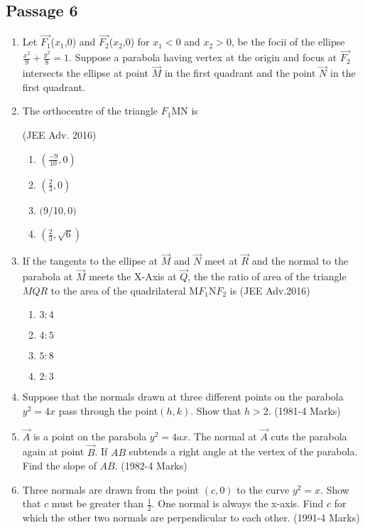 \subsection*{Passage 6}
\begin{enumerate}
\item[] Let $\vec{F_1}$($x_1$,0) and  $\vec{F_2}$($x_2$,0) for $x_1<0$ and $x_2>0$, be the focii of the ellipse $\frac{x^2}{9}+\frac{y^2}{8} =1$. Suppose a parabola having vertex at the origin and focus at $\vec{F_2}$ intersects the ellipse at point $\Vec{M}$ in the first quadrant and the point $\Vec{N}$ in the first quadrant.
\item The orthocentre of the triangle $F_1$MN is

         \hfill(JEE Adv. 2016)
\begin{enumerate}
     \item $(\frac{-9}{10},0)$   
     \item $(\frac{2}{3},0)$     
     \item $($9/10$,0)$ 
    \item $(\frac{2}{3},\sqrt{6})$ 
    \end{enumerate}
\item If the tangents to the ellipse at $\Vec{M}$ and $\Vec{N}$ meet at $\Vec{R}$ and the normal to the parabola at $\Vec{M}$ meets the X-Axis at $\Vec{Q}$, the the ratio of area of the triangle $MQR$ to the area of the quadrilateral M$F_1$N$F_2$ is
\hfill(JEE Adv.2016)
\begin{enumerate}
    \item $3:4$
    \item $4:5$
    \item $5:8$
    \item $2:3$
\end{enumerate}
    \item Suppose that the normals drawn at three different points on the parabola $y^2=4x$ pass through the point$(h,k)$. Show that $h>2$. 
		\hfill(1981-4 Marks)
		
	\item $\vec{A}$ is a point on the parabola $y^2=4ax$. The normal at $\vec{A}$ cuts the parabola again at point $\vec{B}$. If $AB$ subtends a right angle at the vertex of the parabola. Find the slope of $AB$.  
		\hfill(1982-4 Marks)
		
	\item Three normals are drawn from the point $(c,0)$ to the curve $y^2=x$. Show that $c$ must be greater than $\frac{1}{2}$. One normal is always the x-axis. Find $c$ for which the other two normals are perpendicular to each other. 
	      \hfill(1991-4 Marks)
		

\end{enumerate}
